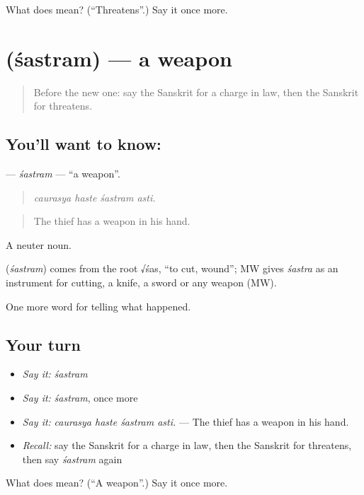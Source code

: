 \begin{tcolorbox}[breakable,colback=teal!4,colframe=teal!35!black,title={Before you move on}]
What does  mean? (\textquotedblleft{}Threatens\textquotedblright{}.) Say it once more.
\end{tcolorbox}
\section[\texorpdfstring{\sk{शस्त्रम्} (śastram)}{शस्त्रम् (śastram)}]{ (śastram) — a weapon}

\label{lesson:SA-C288-sastram}



\begin{quote}
Before the new one: say the Sanskrit for a charge in law, then the Sanskrit for threatens.
\end{quote}

\subsection*{You'll want to know: }
\textbf{} — \emph{śastram} — \textquotedblleft{}a weapon\textquotedblright{}.

\begin{quote}
   
\end{quote}

\begin{quote}
\emph{caurasya haste śastram asti.}
\end{quote}

\begin{quote}
The thief has a weapon in his hand.
\end{quote}

A neuter noun.

\begin{cousinweb}
\textbf{} (\emph{śastram}) comes from the root √śas, \textquotedblleft{}to cut, wound\textquotedblright{}; MW gives \emph{śastra} as an instrument for cutting, a knife, a sword or any weapon (MW).
\end{cousinweb}

\begin{grammarlens}[title={What you've built}]
One more word for telling what happened.
\end{grammarlens}

\subsection*{Your turn}
\begin{itemize}
\raggedright
  \item \emph{Say it:} \emph{śastram}
  \item \emph{Say it:} \emph{śastram}, once more
  \item \emph{Say it:} \emph{caurasya haste śastram asti.} — The thief has a weapon in his hand.
  \item \emph{Recall:} say the Sanskrit for a charge in law, then the Sanskrit for threatens, then say \emph{śastram} again
\end{itemize}

\begin{tcolorbox}[breakable,colback=teal!4,colframe=teal!35!black,title={Before you move on}]
What does  mean? (\textquotedblleft{}A weapon\textquotedblright{}.) Say it once more.
\end{tcolorbox}
